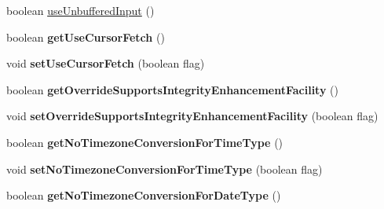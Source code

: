 \begin{DoxyCompactItemize}
\item 
boolean \mbox{\hyperlink{classcom_1_1mysql_1_1jdbc_1_1_connection_properties_impl_a26abe51afeb7e57aadd5791da025c68b}{use\+Unbuffered\+Input}} ()
\item 
\mbox{\label{classcom_1_1mysql_1_1jdbc_1_1_connection_properties_impl_a9d7325c7953ede70802007b43d986ae6}} 
boolean {\bfseries get\+Use\+Cursor\+Fetch} ()
\item 
\mbox{\label{classcom_1_1mysql_1_1jdbc_1_1_connection_properties_impl_a07bbf80ae84f16ba986cc208068ca5b2}} 
void {\bfseries set\+Use\+Cursor\+Fetch} (boolean flag)
\item 
\mbox{\label{classcom_1_1mysql_1_1jdbc_1_1_connection_properties_impl_a2a6c8bae7aa3a1f8990d422934205e47}} 
boolean {\bfseries get\+Override\+Supports\+Integrity\+Enhancement\+Facility} ()
\item 
\mbox{\label{classcom_1_1mysql_1_1jdbc_1_1_connection_properties_impl_a0d25397c5f9ede9802254f2d5dd28ef9}} 
void {\bfseries set\+Override\+Supports\+Integrity\+Enhancement\+Facility} (boolean flag)
\item 
\mbox{\label{classcom_1_1mysql_1_1jdbc_1_1_connection_properties_impl_aec042f4751f24311a251c73dfd163f03}} 
boolean {\bfseries get\+No\+Timezone\+Conversion\+For\+Time\+Type} ()
\item 
\mbox{\label{classcom_1_1mysql_1_1jdbc_1_1_connection_properties_impl_ac27b6e0126d1c1a2a9806fe4db8ee4cf}} 
void {\bfseries set\+No\+Timezone\+Conversion\+For\+Time\+Type} (boolean flag)
\item 
\mbox{\label{classcom_1_1mysql_1_1jdbc_1_1_connection_properties_impl_a7b634b5cc31e41accc00e9704bb66d14}} 
boolean {\bfseries get\+No\+Timezone\+Conversion\+For\+Date\+Type} ()
\item 
\mbox{\label{classcom_1_1mysql_1_1jdbc_1_1_connection_properties_impl_a435585a70d144603085fb87b45090c26}} 

\end{DoxyCompactItemize}
